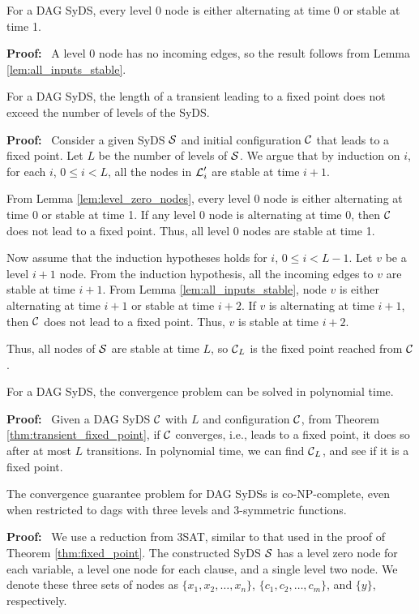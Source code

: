 \begin{lemma}\label{lem:level_zero_nodes}
For a DAG SyDS, every level 0 node is either alternating at time 0 or stable at time 1.
\end{lemma}
\noindent
\textbf{Proof:}~ 
 A level 0 node has no incoming edges,
so the result follows from Lemma \ref{lem:all_inputs_stable}.
\QED

\begin{theorem}\label{thm:transient_fixed_point}
For a DAG SyDS,
the length of a transient leading to a fixed point does not exceed the number of levels of the SyDS.
\end{theorem}
\noindent
\textbf{Proof:}~ 
Consider a given SyDS $\mbox{$\mathcal{S}$}$ and initial configuration $\mbox{$\mathcal{C}$}$ that leads to a fixed point.
Let $L$ be the number of levels of $\mbox{$\mathcal{S}$}$.
We argue that by induction on $i$, for each $i$, $0 \leq i < L$,
all the nodes in $\mbox{$\mathcal{L}$}_i'$ are stable at time $i+1$.

From Lemma \ref{lem:level_zero_nodes},
every level 0 node is either alternating at time 0 or stable at time 1.
If any level 0 node is alternating at time 0, then $\mbox{$\mathcal{C}$}$ does not lead to a fixed point.
Thus, all level 0 nodes are stable at time 1.

Now assume that the induction hypotheses holds for $i$, $0 \leq i < L-1$.
Let $v$ be a level $i+1$ node.
From the induction hypothesis, all the incoming edges to $v$ are stable at time $i+1$.
From Lemma \ref{lem:all_inputs_stable},
node $v$ is either alternating at time $i+1$ or stable at time $i+2$.
If $v$ is alternating at time $i+1$, then $\mbox{$\mathcal{C}$}$ does not lead to a fixed point.
Thus, $v$ is stable at time $i+2$.

Thus, all nodes of $\mbox{$\mathcal{S}$}$ are stable at time $L$,
so  $\mbox{$\mathcal{C}$}_L$ is the fixed point reached from $\mbox{$\mathcal{C}$}$.
\QED

\begin{corollary}\label{cor:convergence}
For a DAG SyDS, the convergence problem can be solved in polynomial time.
\end{corollary}
\noindent
\textbf{Proof:}~ Given a DAG SyDS $\mbox{$\mathcal{C}$}$ with $L$ and configuration $\mbox{$\mathcal{C}$}$,
from Theorem \ref{thm:transient_fixed_point},
if $\mbox{$\mathcal{C}$}$ converges, i.e., leads to a fixed point,
it does so after at most $L$ transitions.
In polynomial time, we can find $\mbox{$\mathcal{C}$}_L$, and see if it is a fixed point.
\QED

\begin{theorem}\label{thm:convergence_guaranee}
The convergence guarantee problem for DAG SyDSs is co-NP-complete,
even when restricted to dags with  three levels and 3-symmetric functions.
\end{theorem}
\noindent
\textbf{Proof:}~ 
We use a reduction from 3SAT, similar to that used in the proof of Theorem \ref{thm:fixed_point}.
The constructed SyDS $\mbox{$\mathcal{S}$}$ has a level zero node for each variable, 
a level one node for each clause, and a single level two node.
We denote these three sets of nodes as $\{x_1, x_2, \ldots , x_n\}$,
$\{c_1,c_2, \ldots , c_m\}$, and $\{y\}$, respectively.

